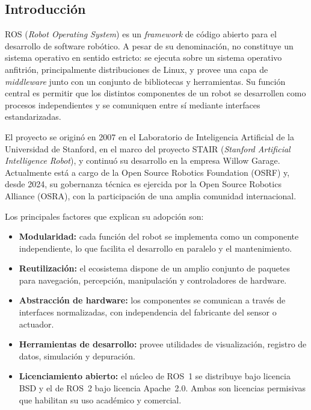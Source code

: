 \subsection{Introducción}

ROS (\textit{Robot Operating System}) es un \textit{framework} de código
abierto para el desarrollo de software robótico. A pesar de su denominación, no
constituye un sistema operativo en sentido estricto: se ejecuta sobre un
sistema operativo anfitrión, principalmente distribuciones de Linux, y provee una capa de
\textit{middleware} junto con un conjunto de bibliotecas y herramientas. Su
función central es permitir que los distintos componentes de un robot se
desarrollen como procesos independientes y se comuniquen entre sí mediante
interfaces estandarizadas.

El proyecto se originó en 2007 en el Laboratorio de Inteligencia Artificial de
la Universidad de Stanford, en el marco del proyecto STAIR (\textit{Stanford
Artificial Intelligence Robot}), y continuó su desarrollo en la empresa Willow
Garage.
Actualmente está a cargo de la Open Source Robotics Foundation (OSRF) y, desde
2024, su gobernanza técnica es ejercida por la Open Source Robotics Alliance
(OSRA), con la participación de una amplia comunidad internacional.

Los principales factores que explican su adopción son:
\begin{itemize}
    \item \textbf{Modularidad:} cada función del robot se implementa como un
    componente independiente, lo que facilita el desarrollo en paralelo y el
    mantenimiento.
    \item \textbf{Reutilización:} el ecosistema dispone de un amplio conjunto
    de paquetes para navegación, percepción, manipulación y controladores de
    hardware.
    \item \textbf{Abstracción de hardware:} los componentes se comunican a
    través de interfaces normalizadas, con independencia del fabricante del
    sensor o actuador.
    \item \textbf{Herramientas de desarrollo:} provee utilidades de
    visualización, registro de datos, simulación y depuración.
    \item \textbf{Licenciamiento abierto:} el núcleo de ROS~1 se distribuye
    bajo licencia BSD y el de ROS~2 bajo licencia Apache~2.0. Ambas son
    licencias permisivas que habilitan su uso académico y comercial.
\end{itemize}

